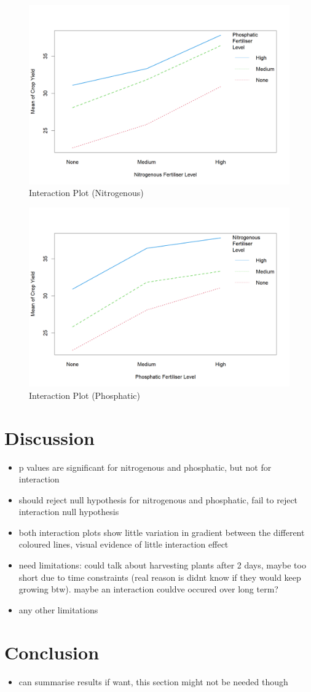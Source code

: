 \documentclass[12pt]{article}
\begin{document}
\begin{figure}[ht]
    \centering
    \includegraphics[width=0.8\linewidth]{Figures/Interaction Plot (Nitrogenous).png}
    \caption{Interaction Plot (Nitrogenous)}
\end{figure}

\begin{figure}[ht]
    \centering
    \caption{Interaction Plot (Phosphatic)}
    \includegraphics[width=0.8\linewidth]{Figures/Interaction Plot (Phosphatic).png}
\end{figure}


\section{Discussion}
\begin{itemize}
    \item p values are significant for nitrogenous and phosphatic, but not for interaction
    \item should reject null hypothesis for nitrogenous and phosphatic, fail to reject interaction null hypothesis
    \item both interaction plots show little variation in gradient between the different coloured lines, visual evidence of little interaction effect
    \item need limitations: could talk about harvesting plants after 2 days, maybe too short due to time constraints (real reason is didnt know if they would keep growing btw). maybe an interaction couldve occured over long term?
    \item any other limitations
\end{itemize}

\section{Conclusion}
\begin{itemize}
    \item can summarise results if want, this section might not be needed though
\end{itemize}

\newpage

\printbibliography
\end{document}
